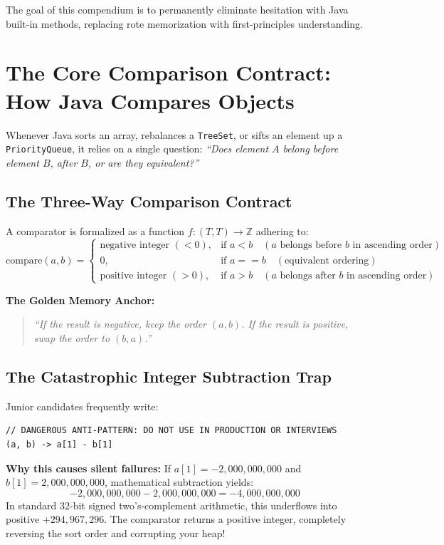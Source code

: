 \documentclass[10pt,journal,compsoc,onecolumn]{IEEEtran}
\begin{document}
The goal of this compendium is to permanently eliminate hesitation with Java built-in methods, replacing rote memorization with first-principles understanding.

\section{The Core Comparison Contract: How Java Compares Objects}
\label{sec:contract}

Whenever Java sorts an array, rebalances a \texttt{TreeSet}, or sifts an element up a \texttt{PriorityQueue}, it relies on a single question: \emph{``Does element $A$ belong before element $B$, after $B$, or are they equivalent?''}

\subsection{The Three-Way Comparison Contract}
A comparator is formalized as a function $f: (T, T) \to \mathbb{Z}$ adhering to:
\begin{equation}
\text{compare}(a, b) = 
\begin{cases} 
\text{negative integer } (< 0), & \text{if } a < b \quad (a \text{ belongs before } b \text{ in ascending order}) \\
0, & \text{if } a == b \quad (\text{equivalent ordering}) \\
\text{positive integer } (> 0), & \text{if } a > b \quad (a \text{ belongs after } b \text{ in ascending order})
\end{cases}
\end{equation}

\textbf{The Golden Memory Anchor:}
\begin{quote}
\emph{``If the result is negative, keep the order $(a, b)$. If the result is positive, swap the order to $(b, a)$.''}
\end{quote}

\subsection{The Catastrophic Integer Subtraction Trap}
Junior candidates frequently write:
\begin{verbatim}
// DANGEROUS ANTI-PATTERN: DO NOT USE IN PRODUCTION OR INTERVIEWS
(a, b) -> a[1] - b[1]
\end{verbatim}
\textbf{Why this causes silent failures:}
If $a[1] = -2{,}000{,}000{,}000$ and $b[1] = 2{,}000{,}000{,}000$, mathematical subtraction yields:
\begin{equation}
-2{,}000{,}000{,}000 - 2{,}000{,}000{,}000 = -4{,}000{,}000{,}000
\end{equation}
In standard 32-bit signed two's-complement arithmetic, this underflows into positive \textbf{$+294{,}967{,}296$}. The comparator returns a positive integer, completely reversing the sort order and corrupting your heap!
\end{document}
